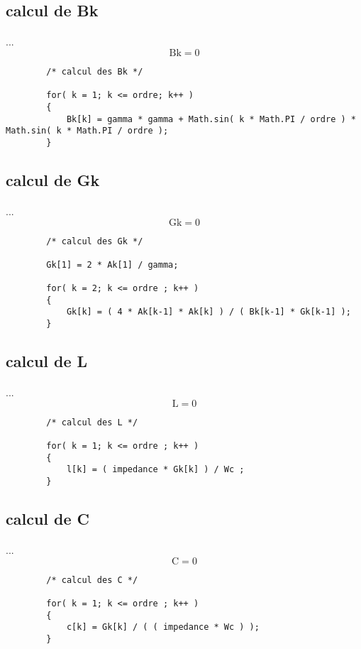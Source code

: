 \documentclass[a4paper,11pt]{article}
\begin{document}
\subsection{calcul de Bk }
    \paragraph{}
    ... \[ \mbox{Bk} = 0 \]
    \begin{lstlisting}
        /* calcul des Bk */

        for( k = 1; k <= ordre; k++ )
        {
            Bk[k] = gamma * gamma + Math.sin( k * Math.PI / ordre ) * Math.sin( k * Math.PI / ordre );
        }

    \end{lstlisting}

\subsection{calcul de Gk }
    \paragraph{}
    ... \[ \mbox{Gk} = 0 \]
    \begin{lstlisting}
        /* calcul des Gk */

        Gk[1] = 2 * Ak[1] / gamma;

        for( k = 2; k <= ordre ; k++ )
        {
            Gk[k] = ( 4 * Ak[k-1] * Ak[k] ) / ( Bk[k-1] * Gk[k-1] );
        }

    \end{lstlisting}

\subsection{calcul de L }
    \paragraph{}
    ... \[ \mbox{L} = 0 \]
    \begin{lstlisting}
        /* calcul des L */

        for( k = 1; k <= ordre ; k++ )
        {
            l[k] = ( impedance * Gk[k] ) / Wc ;
        }

    \end{lstlisting}

\subsection{calcul de C }
    \paragraph{}
    ... \[ \mbox{C} = 0 \]
    \begin{lstlisting}
        /* calcul des C */

        for( k = 1; k <= ordre ; k++ )
        {
            c[k] = Gk[k] / ( ( impedance * Wc ) );
        }

    \end{lstlisting}
\end{document}
